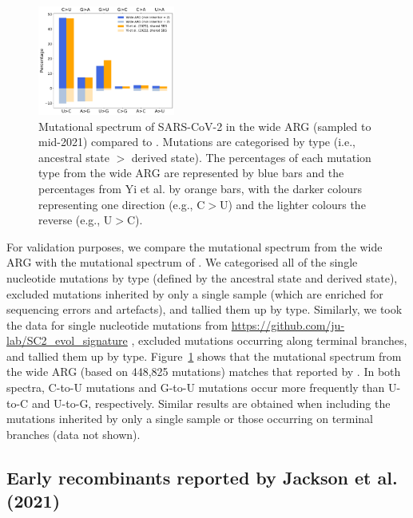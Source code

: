 \documentclass{article}
\begin{document}
\begin{figure} \centering
\includegraphics[width=0.4\textwidth]{figures/mutational_spectra.pdf}
\caption{\label{fig:mutational_spectra}
Mutational spectrum of SARS-CoV-2 in
the wide ARG (sampled to mid-2021) compared to \cite{Yi2021-sc}. Mutations are
categorised by type (i.e., ancestral state $>$ derived state). The percentages
of each mutation type from the wide ARG are represented by blue bars and the
percentages from Yi et al. by orange bars, with the darker colours representing
one direction (e.g., C$>$U) and the lighter colours the reverse (e.g., U$>$C).}
\end{figure}

For validation purposes, we compare the mutational spectrum from the wide ARG
with the mutational spectrum of \citet{Yi2021-sc}. We categorised all of the
single nucleotide mutations by type (defined by the ancestral state and derived
state), excluded mutations inherited by only a single sample (which are
enriched for sequencing errors and artefacts), and tallied them up by type.
Similarly, we took the data for single nucleotide mutations from
\url{https://github.com/ju-lab/SC2_evol_signature} \citep{Yi2021-sc}, excluded
mutations occurring along terminal branches, and tallied them up by type.
Figure~\ref{fig:mutational_spectra} shows that the mutational spectrum from the
wide ARG (based on 448,825 mutations) matches that reported by \citet[based on
92,344 mutations]{Yi2021-sc}. In both spectra, C-to-U mutations and G-to-U
mutations occur more frequently than U-to-C and U-to-G, respectively. Similar
results are obtained when including the mutations inherited by only a single
sample or those occurring on terminal branches (data not shown).


\subsection{Early recombinants reported by Jackson et al. (2021)}
\end{document}
